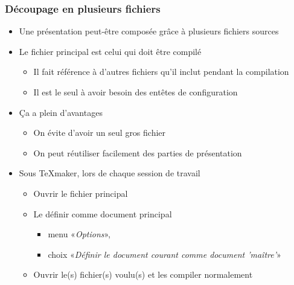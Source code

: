 \begin{frame}
  \frametitle{Découpage en plusieurs fichiers}

  \begin{itemize}
  \item Une présentation peut-être composée grâce à plusieurs fichiers sources
  \item Le fichier principal est celui qui doit être compilé

    \begin{itemize}
    \item Il fait référence à d'autres fichiers qu'il inclut pendant la compilation
    \item Il est le seul à avoir besoin des entêtes de configuration
    \end{itemize}

  \item Ça a plein d'avantages

    \begin{itemize}
    \item On évite d'avoir un seul gros fichier
    \item On peut réutiliser facilement des parties de présentation 
    \end{itemize}

    \pause

  \item Sous TeXmaker, lors de chaque session de travail

    \begin{itemize}
    \item Ouvrir le fichier principal
    \item Le définir comme document principal

      \begin{itemize}
      \item menu «\emph{Options}»,
      \item choix «\emph{Définir le document courant comme document 'maître'}»
      \end{itemize}

    \item Ouvrir le(s) fichier(s) voulu(s) et les compiler normalement
    \end{itemize}

  \end{itemize}
\end{frame}

